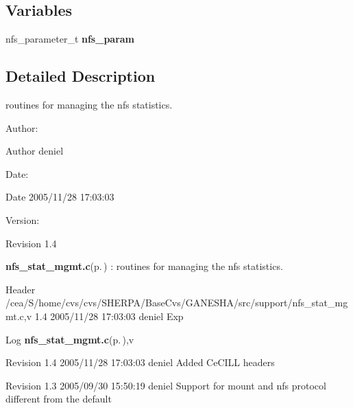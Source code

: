 \subsection*{Variables}
\begin{CompactItemize}
\item 
nfs\_\-parameter\_\-t {\bf nfs\_\-param}
\end{CompactItemize}


\subsection{Detailed Description}
routines for managing the nfs statistics. 

\begin{Desc}
\item[Author:]\begin{Desc}
\item[Author]deniel \end{Desc}
\end{Desc}
\begin{Desc}
\item[Date:]\begin{Desc}
\item[Date]2005/11/28 17:03:03 \end{Desc}
\end{Desc}
\begin{Desc}
\item[Version:]\begin{Desc}
\item[Revision]1.4 \end{Desc}
\end{Desc}
{\bf nfs\_\-stat\_\-mgmt.c}{\rm (p.\,\pageref{nfs__stat__mgmt_8c})} : routines for managing the nfs statistics.

\begin{Desc}
\item[Header]/cea/S/home/cvs/cvs/SHERPA/Base\-Cvs/GANESHA/src/support/nfs\_\-stat\_\-mgmt.c,v 1.4 2005/11/28 17:03:03 deniel Exp \end{Desc}


\begin{Desc}
\item[Log]{\bf nfs\_\-stat\_\-mgmt.c}{\rm (p.\,\pageref{nfs__stat__mgmt_8c})},v \end{Desc}
Revision 1.4 2005/11/28 17:03:03 deniel Added Ce\-CILL headers

Revision 1.3 2005/09/30 15:50:19 deniel Support for mount and nfs protocol different from the default

